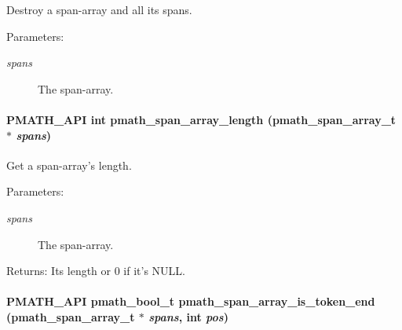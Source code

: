 Destroy a span-array and all its spans. 

\begin{Desc}
\item[Parameters:]
\begin{description}
\item[{\em spans}]The span-array. \end{description}
\end{Desc}
\hypertarget{group__parser_g30df905fabf7b04493548bcafe85d3d4}{
\paragraph[{pmath\_\-span\_\-array\_\-length}]{\setlength{\rightskip}{0pt plus 5cm}PMATH\_\-API int pmath\_\-span\_\-array\_\-length ({\bf pmath\_\-span\_\-array\_\-t} $\ast$ {\em spans})}\hfill}
\label{group__parser_g30df905fabf7b04493548bcafe85d3d4}


Get a span-array's length. 

\begin{Desc}
\item[Parameters:]
\begin{description}
\item[{\em spans}]The span-array. \end{description}
\end{Desc}
\begin{Desc}
\item[Returns:]Its length or 0 if it's NULL. \end{Desc}
\hypertarget{group__parser_g0bb7df579ed425ec719cf2eb85093517}{
\paragraph[{pmath\_\-span\_\-array\_\-is\_\-token\_\-end}]{\setlength{\rightskip}{0pt plus 5cm}PMATH\_\-API {\bf pmath\_\-bool\_\-t} pmath\_\-span\_\-array\_\-is\_\-token\_\-end ({\bf pmath\_\-span\_\-array\_\-t} $\ast$ {\em spans}, \/  int {\em pos})}\hfill}
\label{group__parser_g0bb7df579ed425ec719cf2eb85093517}


